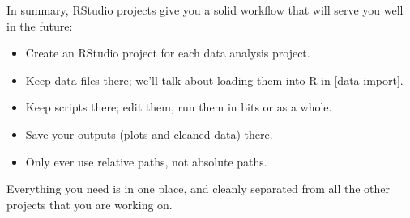 \documentclass[letterpaper,12pt,twoside,]{pinp}
\begin{document}
In summary, RStudio projects give you a solid workflow that will serve
you well in the future:

\begin{itemize}
\item
  Create an RStudio project for each data analysis project.
\item
  Keep data files there; we'll talk about loading them into R in {[}data
  import{]}.
\item
  Keep scripts there; edit them, run them in bits or as a whole.
\item
  Save your outputs (plots and cleaned data) there.
\item
  Only ever use relative paths, not absolute paths.
\end{itemize}

Everything you need is in one place, and cleanly separated from all the
other projects that you are working on.

\end{document}

